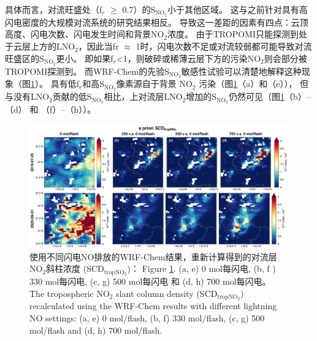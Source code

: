 具体而言，对流旺盛处（f$_r$ $\geq$ 0.7）的S$_{\textrm{NO$_2$}}$小于其他区域。
这与之前针对具有高闪电密度的大规模对流系统的研究结果相反\citep{Beirle.2009}。
导致这一差距的因素有四点：云顶高度、闪电次数、闪电发生时间和背景NO$_2$浓度。
由于TROPOMI只能探测到处于云层上方的LNO$_2$，因此当fr $\approx$ 1时，闪电次数不足或对流较弱都可能导致对流旺盛区的S$_{\textrm{NO$_2$}}$更小。
即如果f$_r$<1，则破碎或稀薄云层下方的污染NO$_2$则会部分被TROPOMI探测到。
而WRF-Chem的先验S$_{\textrm{NO$_2$}}$敏感性试验可以清楚地解释这种现象（图\ref{fig:s5p_apriori_scd}）。
具有低f$_r$和高S$_{\textrm{NO$_2$}}$像素源自于背景 NO$_2$ 污染（图\ref{fig:s5p_apriori_scd}（a）和（e）），
但与没有LNO$_2$贡献的低S$_{\textrm{NO$_2$}}$相比，上对流层LNO$_2$增加的S$_{\textrm{NO$_2$}}$仍然可见（图\ref{fig:s5p_apriori_scd}（b）--（d） 和 （f）--（h））。

\begin{figure}[!htbp]
    \includegraphics[width=17cm]{./figures/s5p_apriori_scd.png}
    \caption{使用不同闪电NO排放的WRF-Chem结果，重新计算得到的对流层NO$_2$斜柱浓度 (SCD$_\textrm{tropNO$_2$}$)：
    Figure \ref{fig:s5p_apriori_scd}. (a, e) 0 mol每闪电, (b, f ) 330 mol每闪电, (c, g) 500 mol每闪电 和 (d, h) 700 mol每闪电。\\
    The tropospheric NO$_2$ slant column density (SCD$_\textrm{tropNO$_2$}$) recalculated using the WRF-Chem results with different lightning NO settings: (a, e) 0 mol/flash, (b, f) 330 mol/flash, (c, g) 500 mol/flash and (d, h) 700 mol/flash.
    }
    \label{fig:s5p_apriori_scd}
\end{figure}


